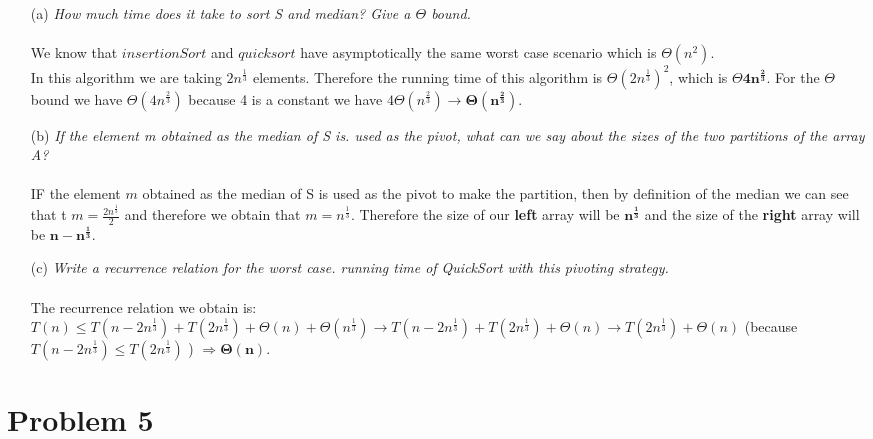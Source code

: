 \documentclass[11pt]{article} \setlength{\oddsidemargin}{0in}
\begin{document}
{  \begin{enumerate}
  \item[(a)] \textit{How much time does it take to sort S and     %
      median? Give a $\Theta$ bound.}
    \\\\
   We know that $insertionSort$ and $quicksort$ have asymptotically the same worst case scenario which is $\Theta ( n^{2} )$.\\
   In this algorithm we are taking $2n^{\frac{1}{3}}$ elements. Therefore the running time of this algorithm is $\Theta(2n^{\frac{1}{3}})^2$, which is $\Theta \mathbf{4 n^{\frac{2}{3}}}$. 
   For the $\Theta$ bound we have $\Theta(4 n^{\frac{2}{3}})$ because 4 is a constant we have $4 \Theta(n^{\frac{2}{3}}) \rightarrow \mathbf{ \Theta(n^{\frac{2}{3}})}$.
   
  \item[(b)] \textit{If the element m obtained as the median of S is.   %
      used as the pivot, what can we say about the sizes of the two
      partitions of the array A?}
    \\\\
    IF the element $m$ obtained as the median of S is used as the pivot to make the partition, then by definition of the median we can see that t $m =\frac {2n^{\frac{1}{3}}}{2}$ and therefore we obtain that $m = n^{\frac{1}{3}}$. Therefore the size of our \textbf{left} array will be $\mathbf{n^{\frac{1}{3}}}$ and the size of the \textbf{right} array will be $\mathbf{n - n^{\frac{1}{3}}}$.
    \\
  \item[(c)] \textit{Write a recurrence relation for the worst case.   %
      running time of QuickSort with this pivoting strategy.}
    \\\\
    The recurrence relation we obtain is: $T(n) \leq T(n - 2n^{\frac{1}{3}}) + T(2n^{\frac{1}{3}}) + \Theta(n) + \Theta(n^{\frac{1}{3}}) \rightarrow T(n - 2n^{\frac{1}{3}}) + T(2n^{\frac{1}{3}}) + \Theta(n) \rightarrow T(2n^{\frac{1}{3}}) + \Theta(n)$ (because $T(n - 2n^{\frac{1}{3}}) \leq T(2n^{\frac{1}{3}})$ ) $\Rightarrow  \mathbf{\Theta(n)}$. \\
     
  \end{enumerate}

  \newpage
  \section*{Problem 5}

}
\end{document}
